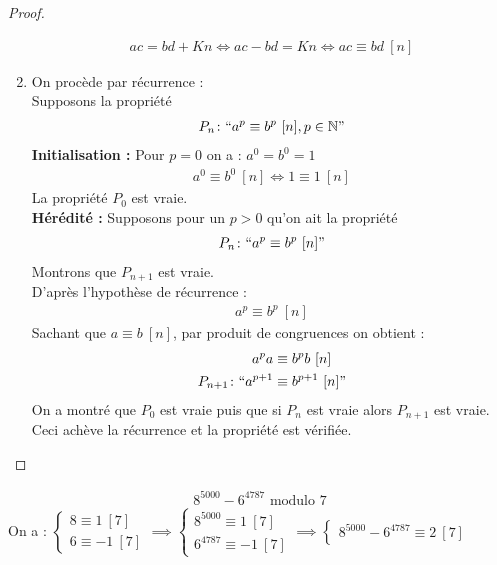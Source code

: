 \begin{proof}
\begin{enumerate}
\begin{align*}
ac = bd + Kn \iff ac - bd = Kn \iff ac \equiv bd \ [n]
\end{align*}
\item On procède par récurrence :
\\
Supposons la propriété
\begin{align*}
P_n \colon ``a^p \equiv b^p \ [n], p \in \mathbb{N}"
\end{align*}
\textbf{Initialisation :} Pour $p = 0$ on a :
$a^0 = b^0 = 1$
\begin{align*}
a^0 \equiv b^0 \ [n] \iff 1 \equiv 1 \ [n]
\end{align*}
La propriété $P_0$ est vraie.
\\
\textbf{Hérédité :} Supposons pour un $p > 0$ qu'on ait la propriété 
\begin{align*}
P_n \colon ``a^p \equiv b^p \ [n]"
\end{align*}
Montrons que $P_{n + 1}$ est vraie.\\
D'après l'hypothèse de récurrence :
\begin{align*}
a^p \equiv b^p \ [n]
\end{align*}
Sachant que $a \equiv b \ [n]$, par produit de congruences on obtient :
\begin{align*}
a^p a &\equiv b^p b \ [n] \\
P_{n+1} \colon ``a^{p+1} &\equiv b^{p+1} \ [n]"
\end{align*}
On a montré que $P_0$ est vraie puis que si $P_n$ est vraie alors $P_{n+1}$ est vraie. Ceci achève la récurrence et la propriété est vérifiée.
\end{enumerate}
\end{proof}

\begin{exemple}
\begin{align*}
8^{5000} - 6^{4787} \text{ modulo } 7
\end{align*}
On a : 
$
\begin{cases}
8 \equiv 1 \ [7] \\
6 \equiv -1 \ [7]
\end{cases}
\implies 
\begin{cases}
8^{5000} \equiv 1 \ [7] \\
6^{4787} \equiv -1 \ [7]
\end{cases}
\implies 
\begin{cases}
8^{5000} - 6^{4787} \equiv 2 \ [7]
\end{cases}
$
\end{exemple}

